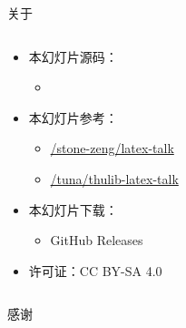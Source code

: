 \begin{frame}{关于}
  \begin{columns}[c]
    \begin{column}{.7\textwidth}
      \begin{itemize}
        \item 本幻灯片源码：
          \begin{itemize}
            \item \href{\githublink}{\faGithub\githublinkpath}
          \end{itemize}
        \item 本幻灯片参考：
          \begin{itemize}
            \item \href{https://github.com/stone-zeng/latex-talk}{\faGithub/stone-zeng/latex-talk}
            \item \href{https://github.com/tuna/thulib-latex-talk}{\faGithub/tuna/thulib-latex-talk}
          \end{itemize}
        \item 本幻灯片下载：
          \begin{itemize}
            \item GitHub Releases 
          \end{itemize}
        \item 许可证：CC BY-SA 4.0 \faCreativeCommons\,\faCreativeCommonsBy\,\faCreativeCommonsSa
      \end{itemize}
    \end{column}
    \begin{column}{.3\textwidth}
    \end{column}
  \end{columns}
\end{frame}

\begin{frame}[standout]
  \begin{center}
    \Huge
    感谢
  \end{center}
\end{frame}
